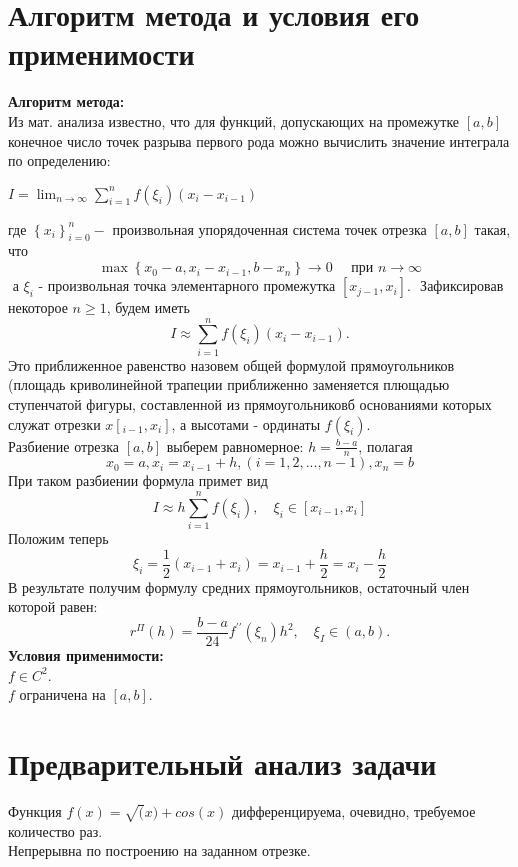 \documentclass[12pt]{article}
\begin{document}
\section{Алгоритм метода и условия его применимости} 
\textbf{Алгоритм метода:} \\ 
Из мат. анализа известно, что для функций, допускающих на промежутке $[a,b]$ конечное число точек разрыва первого рода можно вычислить значение интеграла по определению:\\
\begin{center}
    $\displaystyle I=\lim _{n \rightarrow \infty} \sum_{i=1}^{n} f\left(\xi_{i}\right)\left(x_{i}-x_{i-1}\right)$
\end{center}
где $\left\{x_{i}\right\}_{i=0}^{n}-$ произвольная упорядоченная система точек отрезка $[a, b]$ такая, что
$$
 \displaystyle \max \left\{x_{0}-a, x_{i}-x_{i-1}, b-x_{n}\right\} \rightarrow 0 \quad \text { при } n\rightarrow \infty
$$
$
\text { а } \xi_{i} \text { - произвольная точка элементарного промежутка }\left[x_{j-1}, x_{i}\right] \text {. }
$
Зафиксировав некоторое $n \geq 1$, будем иметь 
$$
I \approx \sum_{i=1}^{n} f\left(\xi_{i}\right)\left(x_{i}-x_{i-1}\right) .
$$
Это приближенное равенство назовем общей формулой прямоугольников (площадь криволинейной трапеции приближенно заменяется плющадью ступенчатой фигуры, составленной из прямоугольниковб основаниями которых служат отрезки $x[_{i-1},x_i]$, а высотами - ординаты $f(\xi_i)$.\\
Разбиение отрезка $\displaystyle [a,b]$ выберем равномерное: $\displaystyle h = \frac{b-a}{n}$, полагая
$$
x_0 = a, x_i = x_{i-1} + h, (i = 1,2, ..., n-1), x_n = b
$$
При таком разбиении формула примет вид
$$
I \approx h \sum_{i=1}^{n} f\left(\xi_{i}\right), \quad \xi_{i} \in\left[x_{i-1}, x_{i}\right]
$$
Положим теперь 
$$
\xi_i = \frac{1}{2}(x_{i-1}+x_i) = x_{i-1}+\frac{h}{2} = x_i - \frac{h}{2}
$$
В результате получим формулу средних прямоугольников, остаточный член которой равен:
$$
r^{\Pi}(h)=\frac{b-a}{24} f^{\prime \prime}\left(\xi_{n}\right) h^{2}, \quad \xi_{I} \in(a, b) .
$$
\textbf{Условия применимости:}\\
$f \in C^2$.\\
$f$ ограничена на $[a,b]$.
\section{Предварительный анализ задачи}
Функция $f(x) = \sqrt(x) + cos(x)$ дифференцируема, очевидно, требуемое количество раз.\\
Непрерывна по построению на заданном отрезке.
\end{document}
